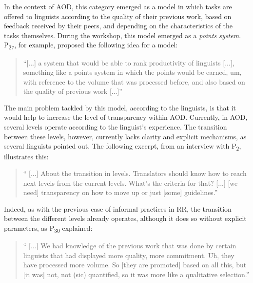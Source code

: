 In the context of AOD, this category emerged as a model in which tasks are offered to linguists according to the quality of their previous work, based on feedback received by their peers, and depending on the characteristics of the tasks themselves. During the workshop, this model emerged as a \textit{points system}. P\textsubscript{27}, for example, proposed the following idea for a model:

\begin{quote}
   ``[...] a system that would be able to rank productivity of linguists [...], something like a points system in which the points would be earned, um, with reference to the volume that was processed before, and also based on the quality of previous work [...]''

\end{quote}


The main problem tackled by this model, according to the linguists, is that it would help to increase the level of transparency within AOD. Currently, in AOD, several levels operate according to the linguist's experience. The transition between these levels, however, currently lacks clarity and explicit mechanisms, as several linguists pointed out. The following excerpt, from an interview with P\textsubscript{2}, illustrates this:

\begin{quote}
    `` [...] About the transition in levels. Translators should know how to reach next levels from the current levels. What's the criteria for that? [...] [we need] transparency on how to move up or just [some] guidelines.''
\end{quote}

Indeed, as with the previous case of informal practices in RR, the transition between the different levels already operates, although it does so without explicit parameters, as P\textsubscript{30} explained:

\begin{quote}
    `` [...] We had knowledge of the previous work that was done by certain linguists that had displayed more quality, more commitment. Uh, they have processed more volume. So [they are promoted] based on all this, but [it was] not, not (sic) quantified, so it was more like a qualitative selection.''
\end{quote}

